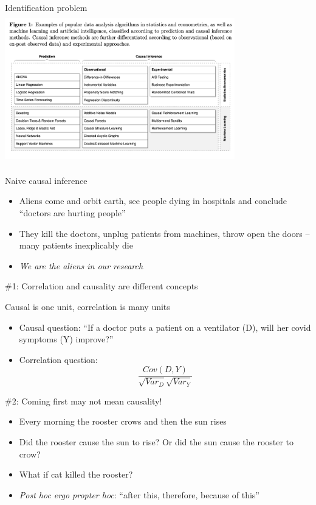 \documentclass{beamer}
\begin{document}
\begin{frame}{Identification problem}
  \centering
  \includegraphics[scale=0.5,height=6.5cm, width=10cm]{./lecture_includes/prediction_causality.png}
\end{frame}




\begin{frame}{Naive causal inference}

  \begin{itemize}
    \item Aliens come and orbit earth, see people dying in hospitals and conclude ``doctors are hurting people''
    \item They kill the doctors, unplug patients from machines, throw open the doors -- many patients inexplicably die
    \item \emph{We are the aliens in our research}
  \end{itemize}

\end{frame}

\begin{frame}{\#1: Correlation and causality are different concepts}

  Causal is one unit, correlation is many units
  \begin{itemize}
    \item Causal question: ``If a doctor puts a patient on a ventilator (D), will her covid symptoms (Y) improve?''
    \item Correlation question:  $$\frac{Cov(D,Y)}{\sqrt{Var_D}\sqrt{{Var_Y}}}$$
  \end{itemize}

\end{frame}


\begin{frame}{\#2: Coming first may not mean causality!}

  \begin{itemize}
    \item Every morning the rooster crows and then the sun rises
    \item Did the rooster cause the sun to rise? Or did the sun cause the rooster to crow?
    \item What if cat killed the rooster?
    \item \emph{Post hoc ergo propter hoc}: ``after this, therefore, because of this''
  \end{itemize}

\end{frame}
\end{document}
